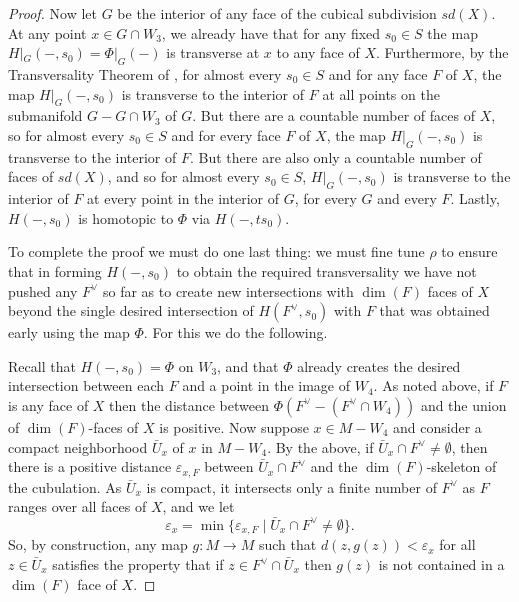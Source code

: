 \begin{proof}
	Now let $G$ be the interior of any face of the cubical subdivision $sd(X)$.
	At any point $x \in G \cap W_3$, we already have that for any fixed $s_0 \in S$ the map $H|_G(-,s_0) = \Phi|_G(-)$ is transverse at $x$ to any face of $X$.
	Furthermore, by the Transversality Theorem of \cite{GuPo74}, for almost every $s_0 \in S$ and for any face $F$ of $X$, the map $H|_G(-,s_0)$ is transverse to the interior of $F$ at all points on the submanifold $G-G \cap W_3$ of $G$.
	But there are a countable number of faces of $X$, so for almost every $s_0 \in S$ and for every face $F$ of $X$, the map $H|_G(-,s_0)$ is transverse to the interior of $F$.
	But there are also only a countable number of faces of $sd(X)$, and so for almost every $s_0 \in S$, $H|_G(-,s_0)$ is transverse to the interior of $F$ at every point in the interior of $G$, for every $G$ and every $F$.
	Lastly, $H(-,s_0)$ is homotopic to $\Phi$ via $H(-, ts_0)$.

	To complete the proof we must do one last thing: we must fine tune $\rho$ to ensure that in forming $H(-,s_0)$ to obtain the required transversality we have not pushed any $F^\vee$ so far as to create new intersections with $\dim(F)$ faces of $X$ beyond the single desired intersection of $H(F^\vee,s_0)$ with $F$ that was obtained early using the map $\Phi$.
	For this we do the following.

	Recall that $H(-,s_0) = \Phi$ on $W_3$, and that $\Phi$ already creates the desired intersection between each $F$ and a point in the image of $W_4$.
	As noted above, if $F$ is any face of $X$ then the distance between $\Phi(F^\vee-(F^\vee \cap W_4))$ and the union of $\dim(F)$-faces of $X$ is positive.
	Now suppose $x \in M-W_4$ and consider a compact neighborhood $\bar U_x$ of $x$ in $M-W_4$.
	By the above, if $\bar U_x \cap F^\vee \neq \emptyset$, then there is a positive distance $\varepsilon_{x,F}$ between $\bar U_x \cap F^\vee$ and the $\dim(F)$-skeleton of the cubulation.
	As $\bar U_x$ is compact, it intersects only a finite number of $F^\vee$ as $F$ ranges over all faces of $X$, and we let $$\varepsilon_x = \min\{\varepsilon_{x,F} \mid \bar U_x \cap F^\vee\neq \emptyset\}.$$
	So, by construction, any map $g \colon M \to M$ such that $d(z,g(z))<\varepsilon_x$ for all $z \in \bar U_x$ satisfies the property that if $z \in F^\vee \cap \bar U_x$ then $g(z)$ is not contained in a $\dim(F)$ face of $X$.


\end{proof}
